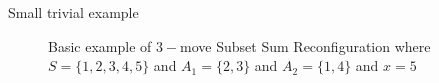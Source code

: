 \begin{example}{Small trivial example}
\begin{figure}[h!]
\begin{center}
\begin{scaletikzpicturetowidth}{\textwidth}
\end{scaletikzpicturetowidth}
\end{center}
\caption{Basic example of $3-$move Subset Sum Reconfiguration where $S = \{1,2,3,4,5\}$ and $A_1 = \{2,3\}$ and $A_2 = \{1,4\}$ and $x = 5$}\label{fig:3_move_subsetsum}
\end{figure}
\end{example}

